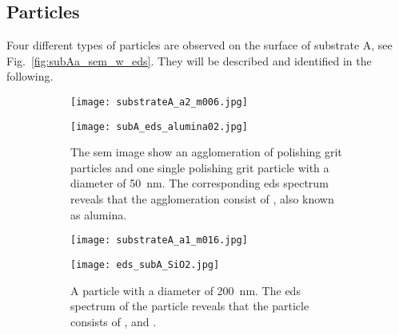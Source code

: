 \subsection{Particles}
Four different types of particles are observed on the surface of substrate A, see Fig.~\ref{fig:subAa_sem_w_eds}. They will be described and identified in the following.

\begin{figure}
    \centering
    \begin{subfigure}[t]{\textwidth}
          \begin{minipage}[t]{0.49\linewidth}
            \centering
            \texttt{[image: substrateA\_a2\_m006.jpg]}
          \end{minipage}
          \hspace{0.02\linewidth}
          \begin{minipage}[t]{0.49\linewidth}
            \centering
            \texttt{[image: subA\_eds\_alumina02.jpg]}
          \end{minipage}
        \caption{The \ac{sem} image show an agglomeration of polishing grit particles and one single polishing grit particle with a diameter of \SI{50}{\nano\metre}. The corresponding \ac{eds} spectrum reveals that the agglomeration consist of , also known as alumina.}\label{fig:subAa_polishing-grit}
    \end{subfigure}
    \par\bigskip
    \begin{subfigure}[t]{\textwidth}
          \begin{minipage}[t]{0.49\linewidth}
            \centering
            \texttt{[image: substrateA\_a1\_m016.jpg]}
          \end{minipage}
          \hspace{0.02\linewidth}
          \begin{minipage}[t]{0.49\linewidth}
            \centering
            \texttt{[image: eds\_subA\_SiO2.jpg]}
          \end{minipage}
        \caption{A particle with a diameter of \SI{200}{\nano\metre}. The \ac{eds} spectrum of the particle reveals that the particle consists of ,  and .}\label{fig:subAa_large-grit}
    \end{subfigure}
    \par\bigskip
    \begin{subfigure}[t]{\textwidth}
          \begin{minipage}[t]{0.49\linewidth}

\end{minipage}
\end{subfigure}
\end{figure}
